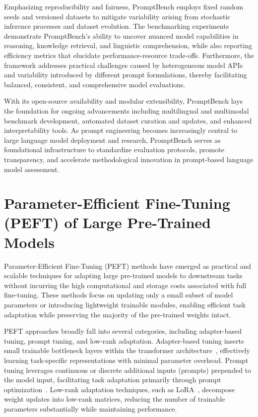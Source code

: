 \documentclass[sigconf]{acmart}
\begin{document}
Emphasizing reproducibility and fairness, PromptBench employs fixed random seeds and versioned datasets to mitigate variability arising from stochastic inference processes and dataset evolution. The benchmarking experiments demonstrate PromptBench's ability to uncover nuanced model capabilities in reasoning, knowledge retrieval, and linguistic comprehension, while also reporting efficiency metrics that elucidate performance-resource trade-offs. Furthermore, the framework addresses practical challenges caused by heterogeneous model APIs and variability introduced by different prompt formulations, thereby facilitating balanced, consistent, and comprehensive model evaluations.

With its open-source availability and modular extensibility, PromptBench lays the foundation for ongoing advancements including multilingual and multimodal benchmark development, automated dataset curation and updates, and enhanced interpretability tools. As prompt engineering becomes increasingly central to large language model deployment and research, PromptBench serves as foundational infrastructure to standardize evaluation protocols, promote transparency, and accelerate methodological innovation in prompt-based language model assessment.

\section{Parameter-Efficient Fine-Tuning (PEFT) of Large Pre-Trained Models}
Parameter-Efficient Fine-Tuning (PEFT) methods have emerged as practical and scalable techniques for adapting large pre-trained models to downstream tasks without incurring the high computational and storage costs associated with full fine-tuning. These methods focus on updating only a small subset of model parameters or introducing lightweight trainable modules, enabling efficient task adaptation while preserving the majority of the pre-trained weights intact.

PEFT approaches broadly fall into several categories, including adapter-based tuning, prompt tuning, and low-rank adaptation. Adapter-based tuning inserts small trainable bottleneck layers within the transformer architecture~\cite{adaptercitation}, effectively learning task-specific representations with minimal parameter overhead. Prompt tuning leverages continuous or discrete additional inputs (prompts) prepended to the model input, facilitating task adaptation primarily through prompt optimization~\cite{prompttuningcitation}. Low-rank adaptation techniques, such as LoRA~\cite{loracitation}, decompose weight updates into low-rank matrices, reducing the number of trainable parameters substantially while maintaining performance.
\end{document}
